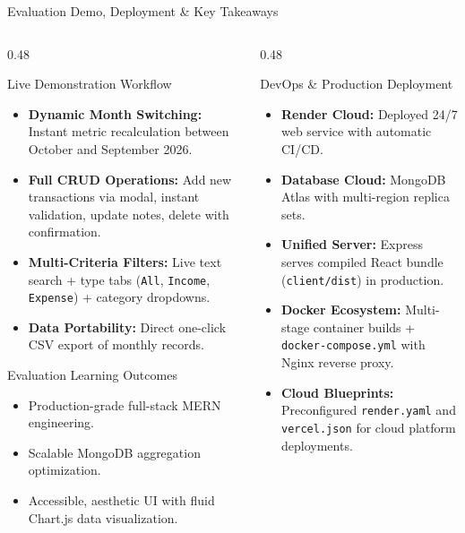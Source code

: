 \documentclass[aspectratio=169, 10pt]{beamer}
\begin{document}
\begin{frame}{Evaluation Demo, Deployment \& Key Takeaways}
  \begin{columns}[T]
    \begin{column}{0.48\textwidth}
      \begin{block}{Live Demonstration Workflow}
        \scriptsize
        \begin{itemize}
          \item \textbf{Dynamic Month Switching:} Instant metric recalculation between October and September 2026.
          \item \textbf{Full CRUD Operations:} Add new transactions via modal, instant validation, update notes, delete with confirmation.
          \item \textbf{Multi-Criteria Filters:} Live text search + type tabs (\texttt{All}, \texttt{Income}, \texttt{Expense}) + category dropdowns.
          \item \textbf{Data Portability:} Direct one-click CSV export of monthly records.
        \end{itemize}
      \end{block}

      \begin{exampleblock}{Evaluation Learning Outcomes}
        \scriptsize
        \begin{itemize}
          \item Production-grade full-stack MERN engineering.
          \item Scalable MongoDB aggregation optimization.
          \item Accessible, aesthetic UI with fluid Chart.js data visualization.
        \end{itemize}
      \end{exampleblock}
    \end{column}

    \begin{column}{0.48\textwidth}
      \begin{block}{DevOps \& Production Deployment}
        \scriptsize
        \begin{itemize}
          \item \textbf{Render Cloud:} Deployed 24/7 web service with automatic CI/CD.
          \item \textbf{Database Cloud:} MongoDB Atlas with multi-region replica sets.
          \item \textbf{Unified Server:} Express serves compiled React bundle (\texttt{client/dist}) in production.
          \item \textbf{Docker Ecosystem:} Multi-stage container builds + \texttt{docker-compose.yml} with Nginx reverse proxy.
          \item \textbf{Cloud Blueprints:} Preconfigured \texttt{render.yaml} and \texttt{vercel.json} for cloud platform deployments.
        \end{itemize}
      \end{block}


\end{column}
\end{columns}
\end{frame}
\end{document}
